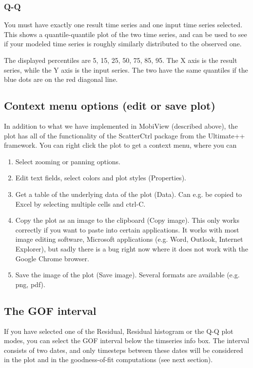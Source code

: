 \documentclass[11pt]{article}
\theoremstyle{definition}
\begin{document}
\subsubsection{Q-Q}

You must have exactly one result time series and one input time series selected. This shows a quantile-quantile plot of the two time series, and can be used to see if your modeled time series is roughly similarly distributed to the observed one.

The displayed percentiles are 5, 15, 25, 50, 75, 85, 95. The X axis is the result series, while the Y axis is the input series. The two have the same quantiles if the blue dots are on the red diagonal line.

\subsection{Context menu options (edit or save plot)}

In addition to what we have implemented in MobiView (described above), the plot has all of the functionality of the ScatterCtrl package from the Ultimate++ framework. You can right click the plot to get a context menu, where you can
\begin{enumerate}[i]
\item Select zooming or panning options.
\item Edit text fields, select colors and plot styles (Properties).
\item Get a table of the underlying data of the plot (Data). Can e.g. be copied to Excel by selecting multiple cells and ctrl-C.
\item Copy the plot as an image to the clipboard (Copy image). This only works correctly if you want to paste into certain applications. It works with most image editing software, Microsoft applications (e.g. Word, Outlook, Internet Explorer), but sadly there is a bug right now where it does not work with the Google Chrome browser.
\item Save the image of the plot (Save image). Several formats are available (e.g. png, pdf).
\end{enumerate}

\subsection{The GOF interval}\label{sec:gofint}

If you have selected one of the Residual, Residual histogram or the Q-Q plot modes, you can select the GOF interval below the timseries info box. The interval consists of two dates, and only timesteps between these dates will be considered in the plot and in the goodness-of-fit computations (see next section).
\end{document}
